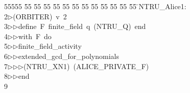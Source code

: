 %
%
\begin{tabbing}
55555 \= 55 \= 55 \= 55 \= 55 \= 55 \= 55 \= 55 \= 55 \= 55 \= 55 \= 55 \= 55 \= \>NTRU\_Alice1:\\[0pt]
2\>$\triangleright$\>(ORBITER)\ v\ 2\ \\[0pt]
3\>$\triangleright$\>$\triangleright$\>define\ F\ finite\_field\ q\ (NTRU\_Q)\ end\ \\[0pt]
4\>$\triangleright$\>$\triangleright$\>with\ F\ do\ \\[0pt]
5\>$\triangleright$\>$\triangleright$\>finite\_field\_activity\ \\[0pt]
6\>$\triangleright$\>$\triangleright$\>extended\_gcd\_for\_polynomials\ \\[0pt]
7\>$\triangleright$\>$\triangleright$\>$\triangleright$\>(NTRU\_XN1)\ (ALICE\_PRIVATE\_F)\ \\[0pt]
8\>$\triangleright$\>$\triangleright$\>end\\[0pt]
9\>\end{tabbing}
